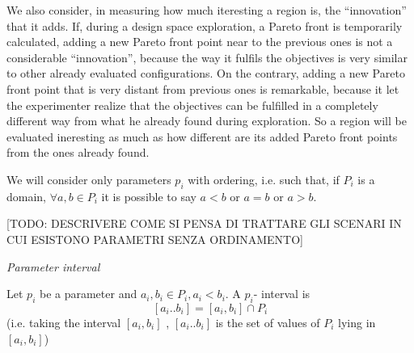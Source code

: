 We also consider, in measuring how much iteresting a region is, the
``innovation'' that it adds. If, during a design space exploration,
a Pareto front is temporarily calculated, adding a new Pareto front
point near to the previous ones is not a considerable ``innovation'',
because the way it fulfils the objectives is very similar to other
already evaluated configurations. On the contrary, adding a new Pareto
front point that is very distant from previous ones is remarkable,
because it let the experimenter realize that the objectives can be
fulfilled in a completely different way from what he already found
during exploration. So a region will be evaluated ineresting as much
as how different are its added Pareto front points from the ones already
found.
\begin{rem}
We will consider only parameters $p_{i}$ with ordering, i.e. such
that, if $P_{i}$ is a domain, $\forall a,b\in P_{i}$ it is possible
to say $a<b$ or $a=b$ or $a>b$.
\end{rem}
{[}TODO: DESCRIVERE COME SI PENSA DI TRATTARE GLI SCENARI IN CUI ESISTONO
PARAMETRI SENZA ORDINAMENTO{]}
\begin{defn}
\emph{Parameter interval}

Let $p_{i}$ be a parameter and $a_{i},b_{i}\in P_{i},a_{i}<b_{i}$.
A $p_{i}$- interval is
\[
\left[a_{i}..b_{i}\right]=\left[a_{i},b_{i}\right]\cap P_{i}
\]
 (i.e. taking the interval $\left[a_{i},b_{i}\right]$ , $\left[a_{i}..b_{i}\right]$
is the set of values of $P_{i}$ lying in $\left[a_{i},b_{i}\right]$)
\end{defn}

